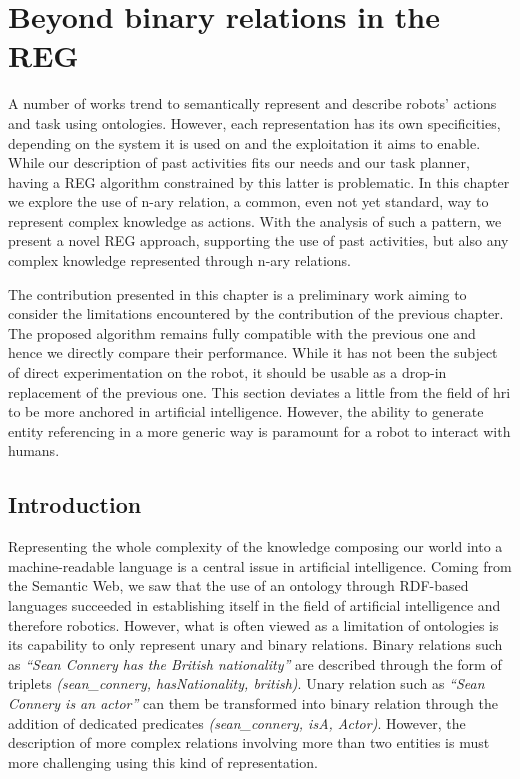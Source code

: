 \ifdefined{}
\else
\setcounter{chapter}{7} %
\dominitoc
\faketableofcontents
\fi

\chapter{Beyond binary relations in the REG}
\minitoc
\label{chap:7}

A number of works trend to semantically represent and describe robots' actions and task using ontologies. However, each representation has its own specificities, depending on the system it is used on and the exploitation it aims to enable. While our description of past activities fits our needs and our task planner, having a REG algorithm constrained by this latter is problematic. In this chapter we explore the use of n-ary relation, a common, even not yet standard, way to represent complex knowledge as actions. With the analysis of such a pattern, we present a novel REG approach, supporting the use of past activities, but also any complex knowledge represented through n-ary relations.

The contribution presented in this chapter is a preliminary work aiming to consider the limitations encountered by the contribution of the previous chapter. The proposed algorithm remains fully compatible with the previous one and hence we directly compare their performance. While it has not been the subject of direct experimentation on the robot, it should be usable as a drop-in replacement of the previous one. This section deviates a little from the field of \acrshort{hri} to be more anchored in artificial intelligence. However, the ability to generate entity referencing in a more generic way is paramount for a robot to interact with humans. 

\section{Introduction}

Representing the whole complexity of the knowledge composing our world into a machine-readable language is a central issue in artificial intelligence. Coming from the Semantic Web, we saw that the use of an ontology through RDF-based languages succeeded in establishing itself in the field of artificial intelligence and therefore robotics. However, what is often viewed as a limitation of ontologies is its capability to only represent unary and binary relations. Binary relations such as \textit{``Sean Connery has the British nationality''} are described through the form of triplets \textit{(sean\_connery, hasNationality, british)}. Unary relation such as \textit{``Sean Connery is an actor''} can them be transformed into binary relation through the addition of dedicated predicates \textit{(sean\_connery, isA, Actor)}. However, the description of more complex relations involving more than two entities is must more challenging using this kind of representation.

